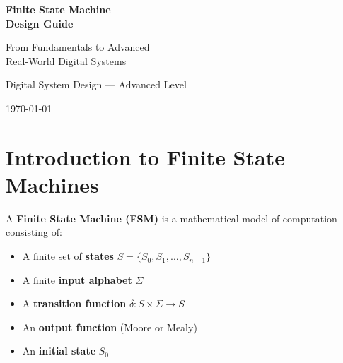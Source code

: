 \documentclass[12pt,a4paper]{article}
\begin{document}
\begin{titlepage}
\centering
\vspace*{2cm}
{\Huge\bfseries\textcolor{primary}{Finite State Machine\\Design Guide}\par}
\vspace{0.5cm}
{\Large\textcolor{accent}{From Fundamentals to Advanced\\Real-World Digital Systems}\par}
\vspace{2cm}


\vspace{2cm}
{\large Digital System Design --- Advanced Level\par}
\vspace{0.5cm}
{\large\today\par}
\end{titlepage}

\tableofcontents
\newpage

\section{Introduction to Finite State Machines}

A \textbf{Finite State Machine (FSM)} is a mathematical model of computation consisting of:
\begin{itemize}
  \item A finite set of \textbf{states} $S = \{S_0, S_1, \ldots, S_{n-1}\}$
  \item A finite \textbf{input alphabet} $\Sigma$
  \item A \textbf{transition function} $\delta: S \times \Sigma \to S$
  \item An \textbf{output function} (Moore or Mealy)
  \item An \textbf{initial state} $S_0$
\end{itemize}
\end{document}

